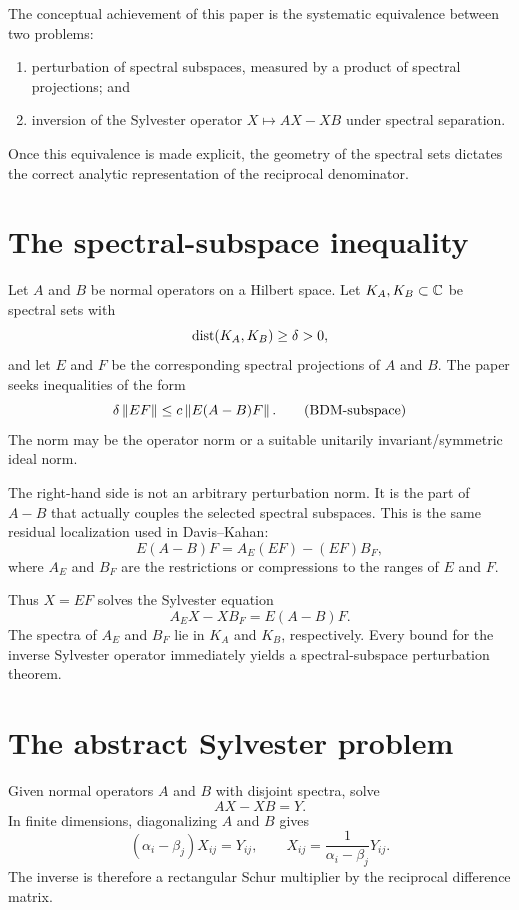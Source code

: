 The conceptual achievement of this paper is the systematic equivalence between two problems:
\begin{enumerate}[leftmargin=2em]
\item perturbation of spectral subspaces, measured by a product of spectral projections; and
\item inversion of the Sylvester operator $X\mapsto AX-XB$ under spectral separation.
\end{enumerate}
Once this equivalence is made explicit, the geometry of the spectral sets dictates the correct analytic representation of the reciprocal denominator.

\section{The spectral-subspace inequality}

Let $A$ and $B$ be normal operators on a Hilbert space. Let $K_A,K_B\subset\mathbb{C}$ be spectral sets with
\[
  \operatorname{dist}(K_A,K_B)\ge\delta>0,
\]
and let $E$ and $F$ be the corresponding spectral projections of $A$ and $B$. The paper seeks inequalities of the form
\begin{equation}
  \delta\left\lVert EF\right\rVert
  \le c\left\lVert E(A-B)F\right\rVert.
  \tag{BDM-subspace}\label{BDM-subspace}
\end{equation}
The norm may be the operator norm or a suitable unitarily invariant/symmetric ideal norm.

The right-hand side is not an arbitrary perturbation norm. It is the part of $A-B$ that actually couples the selected spectral subspaces. This is the same residual localization used in Davis--Kahan:
\[
  E(A-B)F
  =A_E(EF)-(EF)B_F,
\]
where $A_E$ and $B_F$ are the restrictions or compressions to the ranges of $E$ and $F$.

Thus $X=EF$ solves the Sylvester equation
\begin{equation}
  A_EX-XB_F=E(A-B)F.
  \tag{BDM-projected-Sylvester}\label{BDM-projected-Sylvester}
\end{equation}
The spectra of $A_E$ and $B_F$ lie in $K_A$ and $K_B$, respectively. Every bound for the inverse Sylvester operator immediately yields a spectral-subspace perturbation theorem.

\section{The abstract Sylvester problem}

Given normal operators $A$ and $B$ with disjoint spectra, solve
\begin{equation}
  AX-XB=Y.
  \tag{BDM-Sylvester}\label{BDM-Sylvester}
\end{equation}
In finite dimensions, diagonalizing $A$ and $B$ gives
\[
  (\alpha_i-\beta_j)X_{ij}=Y_{ij},
  \qquad
  X_{ij}=\frac{1}{\alpha_i-\beta_j}Y_{ij}.
\]
The inverse is therefore a rectangular Schur multiplier by the reciprocal difference matrix.

